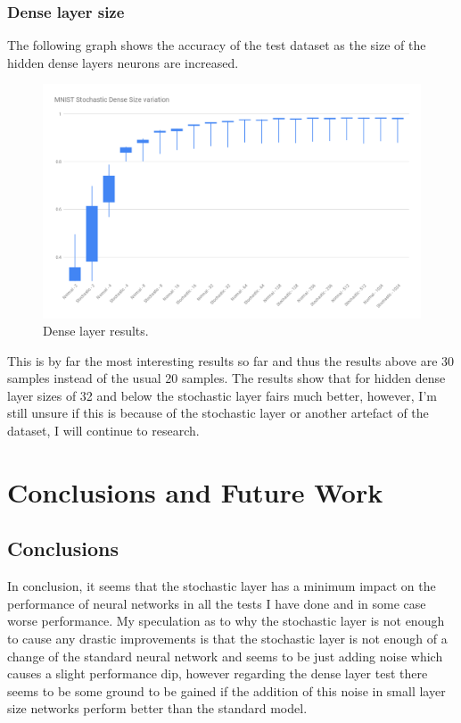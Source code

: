 \documentclass[a4paper,oneside,phd,etd]{BYUPhys}
\begin{document}
\subsection{Dense layer size}
The following graph shows the accuracy of the test dataset as the size of the hidden dense layers neurons are increased.
\begin{figure}[H]
\centering
\includegraphics[width=16cm]{results/dense_layer.png}
\caption{Dense layer results.}
\label{fig:denselayer}
\end{figure}

This is by far the most interesting results so far and thus the results above are 30 samples instead of the usual 20 samples. The results show that for hidden dense layer sizes of 32 and below the stochastic layer fairs much better, however, I'm still unsure if this is because of the stochastic layer or another artefact of the dataset, I will continue to research.

\chapter{Conclusions and Future Work}
\label{chap:Conclusions}

\section{Conclusions}
\label{sec:ConclusionsConclusions}
In conclusion, it seems that the stochastic layer has a minimum impact on the performance of neural networks in all the tests I have done and in some case worse performance. My speculation as to why the stochastic layer is not enough to cause any drastic improvements is that the stochastic layer is not enough of a change of the standard neural network and seems to be just adding noise which causes a slight performance dip, however regarding the dense layer test there seems to be some ground to be gained if the addition of this noise in small layer size networks perform better than the standard model.
\end{document}
